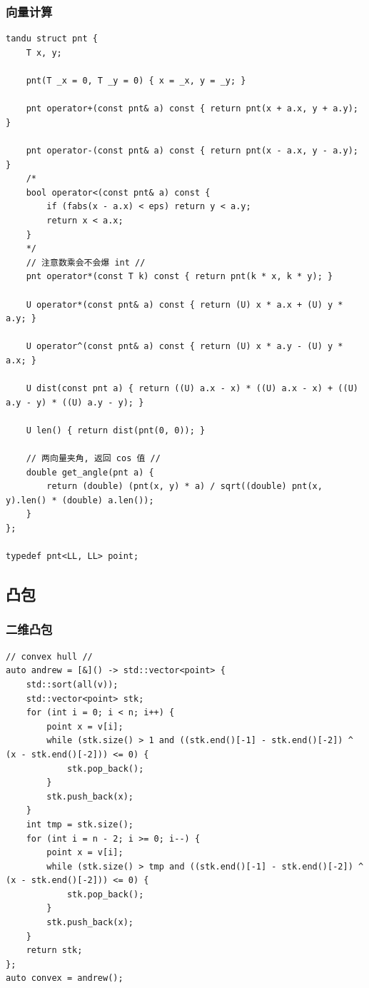 \documentclass[UTF8, a4paper, titlepage, twoside]{ctexart}
\begin{document}
\subsubsection{ 向量计算 }
\begin{lstlisting}[style=cpp]
tandu struct pnt {
    T x, y;

    pnt(T _x = 0, T _y = 0) { x = _x, y = _y; }

    pnt operator+(const pnt& a) const { return pnt(x + a.x, y + a.y); }

    pnt operator-(const pnt& a) const { return pnt(x - a.x, y - a.y); }
    /*
	bool operator<(const pnt& a) const {
        if (fabs(x - a.x) < eps) return y < a.y;
        return x < a.x;
    }
    */
    // 注意数乘会不会爆 int //
    pnt operator*(const T k) const { return pnt(k * x, k * y); }

    U operator*(const pnt& a) const { return (U) x * a.x + (U) y * a.y; }

    U operator^(const pnt& a) const { return (U) x * a.y - (U) y * a.x; }

    U dist(const pnt a) { return ((U) a.x - x) * ((U) a.x - x) + ((U) a.y - y) * ((U) a.y - y); }

    U len() { return dist(pnt(0, 0)); }

    // 两向量夹角, 返回 cos 值 //
    double get_angle(pnt a) {
        return (double) (pnt(x, y) * a) / sqrt((double) pnt(x, y).len() * (double) a.len());
    }
};

typedef pnt<LL, LL> point;
\end{lstlisting}

\subsection{ 凸包 }
\subsubsection{ 二维凸包 }
\begin{lstlisting}
// convex hull //
auto andrew = [&]() -> std::vector<point> {
    std::sort(all(v));
    std::vector<point> stk;
    for (int i = 0; i < n; i++) {
        point x = v[i];
        while (stk.size() > 1 and ((stk.end()[-1] - stk.end()[-2]) ^ (x - stk.end()[-2])) <= 0) {
            stk.pop_back();
        }
        stk.push_back(x);
    }
    int tmp = stk.size();
    for (int i = n - 2; i >= 0; i--) {
        point x = v[i];
        while (stk.size() > tmp and ((stk.end()[-1] - stk.end()[-2]) ^ (x - stk.end()[-2])) <= 0) {
            stk.pop_back();
        }
        stk.push_back(x);
    }
    return stk;
};
auto convex = andrew();
\end{lstlisting}
\end{document}
